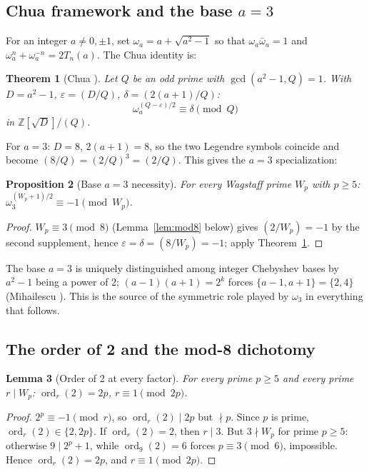 \documentclass[11pt]{amsart}
\theoremstyle{plain}
\newtheorem{theorem}{Theorem}[section]
\newtheorem{proposition}[theorem]{Proposition}
\newtheorem{lemma}[theorem]{Lemma}
\theoremstyle{definition}
\theoremstyle{remark}
\numberwithin{equation}{section}
\newcommand{\ord}{\operatorname{ord}}
\newcommand{\Z}{\mathbb{Z}}
\begin{document}
\subsection{Chua framework and the base \texorpdfstring{$a = 3$}{a = 3}}

For an integer $a \neq 0, \pm 1$, set $\omega_a = a + \sqrt{a^2 - 1}$ so that $\omega_a \bar\omega_a = 1$ and $\omega_a^n + \omega_a^{-n} = 2 T_n(a)$. The Chua identity is:

\begin{theorem}[Chua \cite{ref:Chua}]\label{thm:chua}
Let $Q$ be an odd prime with $\gcd(a^2 - 1, Q) = 1$. With $D = a^2 - 1$, $\varepsilon = (D/Q)$, $\delta = (2(a+1)/Q)$:
\[
  \omega_a^{(Q - \varepsilon)/2} \equiv \delta \pmod Q
\]
in $\Z[\sqrt{D}]/(Q)$.
\end{theorem}

For $a = 3$: $D = 8$, $2(a+1) = 8$, so the two Legendre symbols coincide and become $(8/Q) = (2/Q)^3 = (2/Q)$. This gives the $a = 3$ specialization:

\begin{proposition}[Base $a = 3$ necessity]\label{prop:necessity}
For every Wagstaff prime $W_p$ with $p \geq 5$: $\omega_3^{(W_p + 1)/2} \equiv -1 \pmod{W_p}$.
\end{proposition}

\begin{proof}
$W_p \equiv 3 \pmod 8$ (Lemma~\ref{lem:mod8} below) gives $(2/W_p) = -1$ by the second supplement, hence $\varepsilon = \delta = (8/W_p) = -1$; apply Theorem~\ref{thm:chua}.
\end{proof}

The base $a = 3$ is uniquely distinguished among integer Chebyshev bases by $a^2 - 1$ being a power of 2; $(a-1)(a+1) = 2^k$ forces $\{a - 1, a + 1\} = \{2, 4\}$ (Mihailescu \cite{ref:Mihailescu}). This is the source of the symmetric role played by $\omega_3$ in everything that follows.

\subsection{The order of 2 and the mod-8 dichotomy}

\begin{lemma}[Order of 2 at every factor]\label{lem:ord2}
For every prime $p \geq 5$ and every prime $r \mid W_p$: $\ord_r(2) = 2p$, $r \equiv 1 \pmod{2p}$.
\end{lemma}

\begin{proof}
$2^p \equiv -1 \pmod r$, so $\ord_r(2) \mid 2p$ but $\nmid p$. Since $p$ is prime, $\ord_r(2) \in \{2, 2p\}$. If $\ord_r(2)=2$, then $r\mid 3$. But $3\nmid W_p$ for prime $p\geq5$: otherwise $9\mid 2^p+1$, while $\ord_9(2)=6$ forces $p\equiv3\pmod6$, impossible. Hence $\ord_r(2)=2p$, and $r\equiv1\pmod{2p}$.
\end{proof}
\end{document}
